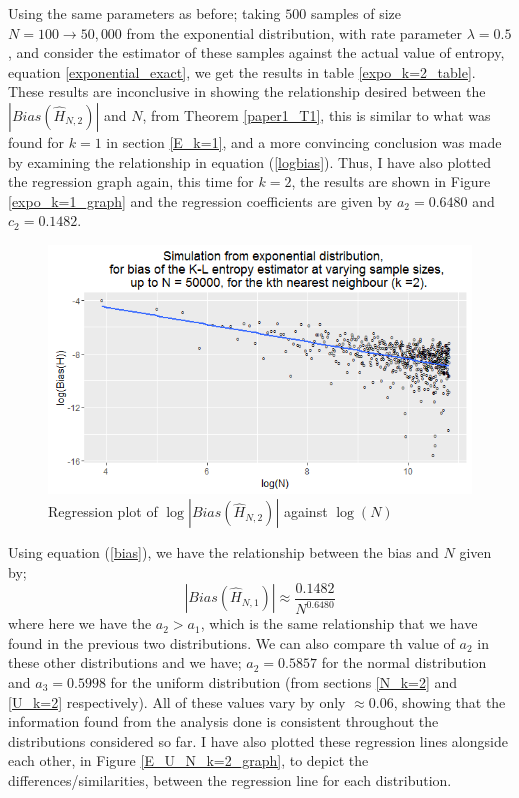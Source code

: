 \documentclass{report}
\begin{document}
Using the same parameters as before; taking $500$ samples of size $N=100 \to 50,000$ from the exponential distribution, with rate parameter $\lambda =0.5$, and consider the estimator of these samples against the actual value of entropy, equation \ref{exponential_exact}, we get the results in table \ref{expo_k=2_table}. These results are inconclusive in showing the relationship desired between the $|Bias(\hat{H}_{N, 2})|$ and $N$, from Theorem \ref{paper1_T1}, this is similar to what was found for $k=1$ in section \ref{E_k=1}, and a more convincing conclusion was made by examining the relationship in equation (\ref{logbias}). Thus, I have also plotted the regression graph again, this time for $k=2$, the results are shown in Figure \ref{expo_k=1_graph} and the regression coefficients are given by $a_{2} = 0.6480$ and $c_{2} = 0.1482$.

\begin{figure}
  \begin{center}
    \includegraphics[width=\textwidth]{./Graphs/Expo_k=2_plot.png}
  \end{center}
\caption{Regression plot of $\log|Bias(\hat{H}_{N, 2})|$ against $\log(N)$}
  \label{expo_k=2_graph}
\end{figure}

Using equation (\ref{bias}), we have the relationship between the bias and $N$ given by;
\begin{equation}
|Bias(\hat{H}_{N, 1})| \approx \frac{0.1482}{N^{0.6480}}\nonumber
\end{equation}
where here we have the $a_{2} > a_{1}$, which is the same relationship that we have found in the previous two distributions. We can also compare th value of $a_{2}$ in these other distributions and we have; $a_{2} = 0.5857$ for the normal distribution and $a_{3}= 0.5998$ for the uniform distribution (from sections \ref{N_k=2} and \ref{U_k=2} respectively). All of these values vary by only $\approx 0.06$, showing that the information found from the analysis done is consistent throughout the distributions considered so far. I have also plotted these regression lines alongside each other, in Figure \ref{E_U_N_k=2_graph}, to depict the differences/similarities, between the regression line for each distribution.
\end{document}
